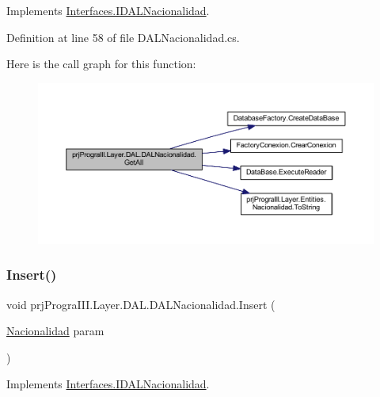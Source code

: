 Implements \hyperlink{interface_interfaces_1_1_i_d_a_l_nacionalidad_a9c4069ad5642445a09d011062b91c9f5}{Interfaces.\+I\+D\+A\+L\+Nacionalidad}.



Definition at line 58 of file D\+A\+L\+Nacionalidad.\+cs.

Here is the call graph for this function\+:
\nopagebreak
\begin{figure}[H]
\begin{center}
\leavevmode
\includegraphics[width=350pt]{classprj_progra_i_i_i_1_1_layer_1_1_d_a_l_1_1_d_a_l_nacionalidad_a7a851ef044363eb2a9be47aaa154b40b_cgraph}
\end{center}
\end{figure}
\hypertarget{classprj_progra_i_i_i_1_1_layer_1_1_d_a_l_1_1_d_a_l_nacionalidad_a9db21efb8376e322b250d5b2a6aaacbd}{}\label{classprj_progra_i_i_i_1_1_layer_1_1_d_a_l_1_1_d_a_l_nacionalidad_a9db21efb8376e322b250d5b2a6aaacbd} 
\subsubsection{\texorpdfstring{Insert()}{Insert()}}
{\footnotesize\ttfamily void prj\+Progra\+I\+I\+I.\+Layer.\+D\+A\+L.\+D\+A\+L\+Nacionalidad.\+Insert (\begin{DoxyParamCaption}\item[{\hyperlink{classprj_progra_i_i_i_1_1_layer_1_1_entities_1_1_nacionalidad}{Nacionalidad}}]{param }\end{DoxyParamCaption})}



Implements \hyperlink{interface_interfaces_1_1_i_d_a_l_nacionalidad_ac11f146d5f5b2a50ef33998088a93fef}{Interfaces.\+I\+D\+A\+L\+Nacionalidad}.



